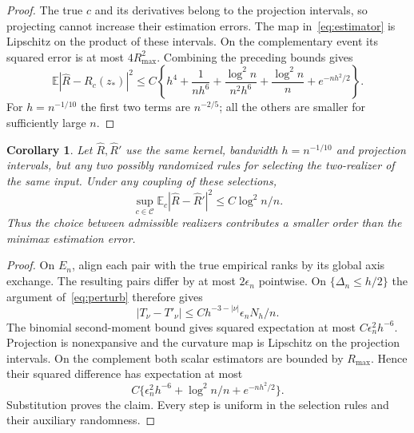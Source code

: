 \documentclass[11pt]{article}
\newtheorem{corollary}[theorem]{Corollary}
\theoremstyle{remark}
\newcommand{\E}{\mathbb E}
\newcommand{\calC}{\mathcal C}
\numberwithin{equation}{section}
\begin{document}
\begin{proof}
The true $c$ and its derivatives belong to the projection intervals,
so projecting cannot increase their estimation errors.
The map in~\eqref{eq:estimator} is Lipschitz on the product of these
intervals. On the complementary event its squared error is at most
$4R_{\max}^2$.
Combining the preceding bounds gives
\[
 \E|\widehat R-R_c(z_*)|^2
 \le C\left\{h^4+\frac1{nh^6}
          +\frac{\log^2n}{n^2h^6}
          +\frac{\log^2n}{n}+e^{-nh^2/2}\right\}.
\]
For $h=n^{-1/10}$ the first two terms are $n^{-2/5}$;
all the others are smaller for sufficiently large $n$.
\end{proof}

\begin{corollary}\label{cor:choice}
Let $\widehat R,\widehat R'$ use the same kernel, bandwidth
$h=n^{-1/10}$ and projection intervals, but any two possibly
randomized rules for selecting the two-realizer of the same input.
Under any coupling of these selections,
\[
 \sup_{c\in\calC}\E_c|\widehat R-\widehat R'|^2
       \le C\log^2n/n .
\]
Thus the choice between admissible realizers contributes a smaller
order than the minimax estimation error.
\end{corollary}
\begin{proof}
On $E_n$, align each pair with the true empirical ranks by its
global axis exchange. The resulting pairs differ by at most
$2\epsilon_n$ pointwise. On $\{\Delta_n\le h/2\}$ the argument
of~\eqref{eq:perturb} therefore gives
\[
 |T_\nu-T'_\nu|\le
       C h^{-3-|\nu|}\epsilon_n N_h/n .
\]
The binomial second-moment bound gives squared expectation at most
$C\epsilon_n^2h^{-6}$. Projection is nonexpansive and the curvature
map is Lipschitz on the projection intervals.
On the complement both scalar estimators are bounded by $R_{\max}$.
Hence their squared difference has expectation at most
\[
 C\{\epsilon_n^2h^{-6}+\log^2n/n+e^{-nh^2/2}\}.
\]
Substitution proves the claim. Every step is uniform in the
selection rules and their auxiliary randomness.
\end{proof}
\end{document}
